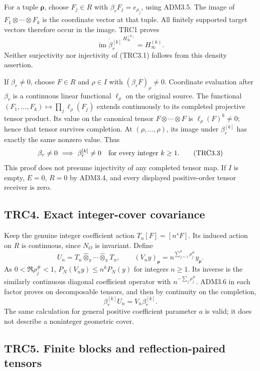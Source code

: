 For a tuple \(\boldsymbol\rho\), choose \(F_j\in R\) with
\(\beta_rF_j=e_{\rho_j}\), using ADM3.5. The image of
\(F_1\otimes\cdots\otimes F_k\) is the coordinate vector at that tuple.
All finitely supported target vectors therefore occur in the image. TRC1
proves \[
\overline{\operatorname{im}\beta_r^{[k]}}^{\,H_\infty^{(k)}}=H_\infty^{(k)}.
\tag{TRC3.2}
\] Neither surjectivity nor injectivity of (TRC3.1) follows from this
density assertion.

If \(\beta_r\ne0\), choose \(F\in R\) and \(\rho\in I\) with
\((\beta_rF)_\rho\ne0\). Coordinate evaluation after \(\beta_r\) is a
continuous linear functional \(\ell_\rho\) on the original source. The
functional \((F_1,\ldots,F_k)\mapsto\prod_j\ell_\rho(F_j)\) extends
continuously to its completed projective tensor product. Its value on
the canonical tensor \(F\otimes\cdots\otimes F\) is
\(\ell_\rho(F)^k\ne0\); hence that tensor survives completion. At
\((\rho,\ldots,\rho)\), its image under \(\beta_r^{[k]}\) has exactly
the same nonzero value. Thus \[
\beta_r\ne0\ \Longrightarrow\ \beta_r^{[k]}\ne0
\quad\hbox{for every integer }k\ge1.
\tag{TRC3.3}
\] This proof does not presume injectivity of any completed tensor map.
If \(I\) is empty, \(E=0\), \(R=0\) by ADM3.4, and every displayed
positive-order tensor receiver is zero.

\subsection{TRC4. Exact integer-cover
covariance}\label{trc4.-exact-integer-cover-covariance}

Keep the genuine integer coefficient action \(T_n[F]=[n^sF]\). Its
induced action on \(R\) is continuous, since \(N_O\) is invariant.
Define \[
U_n=T_n\widehat\otimes_\pi\cdots\widehat\otimes_\pi T_n,
\qquad
(V_ny)_{\boldsymbol\rho}=n^{\sum_{j=1}^k\rho_j^\#}y_{\boldsymbol\rho}.
\tag{TRC4.1}
\] As \(0<\Re\rho_j^\#<1\), \(P_N(V_ny)\le n^kP_N(y)\) for integers
\(n\ge1\). Its inverse is the similarly continuous diagonal coefficient
operator with \(n^{-\sum_j\rho_j^\#}\). ADM3.6 in each factor proves on
decomposable tensors, and then by continuity on the completion, \[
\beta_r^{[k]}U_n=V_n\beta_r^{[k]}.
\tag{TRC4.2}
\] The same calculation for general positive coefficient parameter \(a\)
is valid; it does not describe a noninteger geometric cover.

\subsection{TRC5. Finite blocks and reflection-paired
tensors}\label{trc5.-finite-blocks-and-reflection-paired-tensors}

